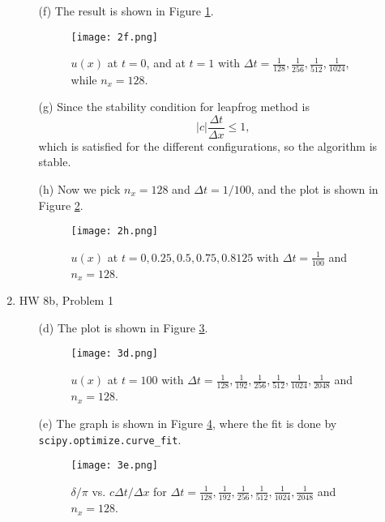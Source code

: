 \documentclass{article}
\begin{document}
\begin{enumerate}
\begin{enumerate}
\item[(f)]
The result is shown in Figure \ref{Problem 2(f)}.

\begin{figure}[h]
\centering
\texttt{[image: 2f.png]}
\caption{$u(x)$ at $t = 0$, and at $t = 1$ with $\Delta t = \frac{1}{128}, \frac{1}{256}, \frac{1}{512}, \frac{1}{1024}$, while $n_x = 128 $.}
\label{Problem 2(f)}
\end{figure}

\item[(g)]
Since the stability condition for leapfrog method is
$$
|c|\frac{\Delta t}{\Delta x} \le 1,
$$
which is satisfied for the different configurations, so the algorithm is stable.

\item[(h)]
Now we pick $n_x = 128$ and $\Delta t = 1/100$, and the plot is shown in Figure \ref{Problem 2(h)}.

\begin{figure}[h]
\centering
\texttt{[image: 2h.png]}
\caption{$u(x)$ at $t = 0, 0.25, 0.5, 0.75, 0.8125$ with $\Delta t = \frac{1}{100}$ and $n_x = 128 $.}
\label{Problem 2(h)}
\end{figure}

\end{enumerate}

\item HW 8b, Problem 1

\begin{enumerate}
\item[(d)]
The plot is shown in Figure \ref{Problem 3(d)}.

\begin{figure}[h]
\centering
\texttt{[image: 3d.png]}
\caption{$u(x)$ at $t = 100$ with $\Delta t = \frac{1}{128}, \frac{1}{192}, \frac{1}{256}, \frac{1}{512}, \frac{1}{1024}, \frac{1}{2048}$ and $n_x = 128 $.}
\label{Problem 3(d)}
\end{figure}

\item[(e)]
The graph is shown in Figure \ref{Problem 3(e)}, where the fit is done by \texttt{scipy.optimize.curve\_fit}.

\begin{figure}[h]
\centering
\texttt{[image: 3e.png]}
\caption{$\delta/\pi$ vs. $c\Delta t/\Delta x$ for $\Delta t = \frac{1}{128}, \frac{1}{192}, \frac{1}{256}, \frac{1}{512}, \frac{1}{1024}, \frac{1}{2048}$ and $n_x = 128 $.}
\label{Problem 3(e)}
\end{figure}


\end{enumerate}
\end{enumerate}
\end{document}
